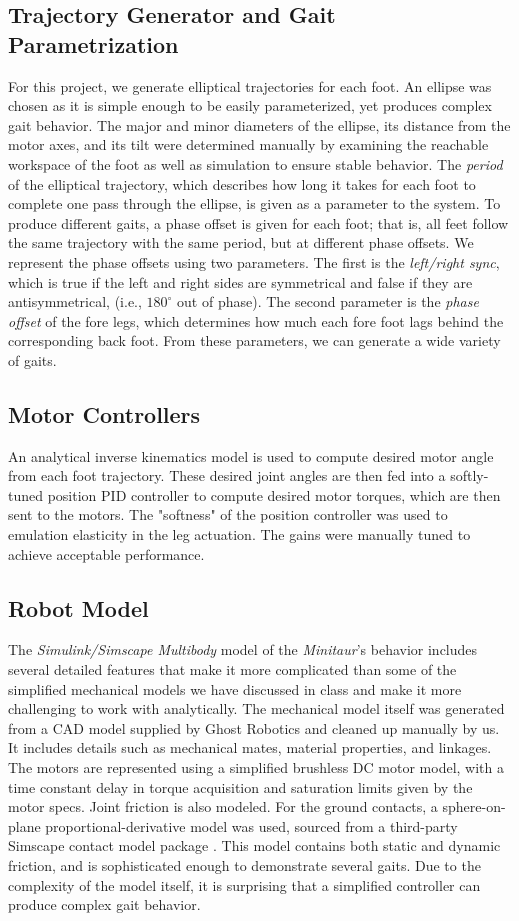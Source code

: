 \documentclass[conference,11pt,letterpaper]{IEEEtran}
\begin{document}
\subsection{Trajectory Generator and Gait Parametrization}
For this project, we generate elliptical trajectories for each foot. An ellipse was chosen as it is simple enough to be easily parameterized, yet produces complex gait behavior. The major and minor diameters of the ellipse, its distance from the motor axes, and its tilt were determined manually by examining the reachable workspace of the foot as well as simulation to ensure stable behavior. The \emph{period} of the elliptical trajectory, which describes how long it takes for each foot to complete one pass through the ellipse, is given as a parameter to the system. To produce different gaits, a phase offset is given for each foot; that is, all feet follow the same trajectory with the same period, but at different phase offsets.  We represent the phase offsets using two parameters. The first is the \emph{left/right sync}, which is true if the left and right sides are symmetrical and false if they are antisymmetrical, (i.e., $180^\circ$ out of phase). The second parameter is the \emph{phase offset} of the fore legs, which determines how much each fore foot lags behind the corresponding back foot. From these parameters, we can generate a wide variety of gaits.


\subsection{Motor Controllers}
An analytical inverse kinematics model is used to compute desired motor angle from each foot trajectory. These desired joint angles are then fed into a softly-tuned position PID controller to compute desired motor torques, which are then sent to the motors. The "softness" of the position controller was used to emulation elasticity in the leg actuation. The gains were manually tuned to achieve acceptable performance. 

\subsection{Robot Model}
The \emph{Simulink/Simscape Multibody} model of the \emph{Minitaur}'s behavior includes several detailed features that make it more complicated than some of the simplified mechanical models we have discussed in class and make it more challenging to work with analytically. The mechanical model itself was generated from a CAD model supplied by Ghost Robotics and cleaned up manually by us. It includes details such as mechanical mates, material properties, and linkages. The motors are represented using a simplified brushless DC motor model, with a time constant delay in torque acquisition and saturation limits given by the motor specs. Joint friction is also modeled. For the ground contacts, a sphere-on-plane proportional-derivative model was used, sourced from a third-party Simscape contact model package \autocite{contactmodel}. This model contains both static and dynamic friction, and is sophisticated enough to demonstrate several gaits. Due to the complexity of the model itself, it is surprising that a simplified controller can produce complex gait behavior.
\end{document}
